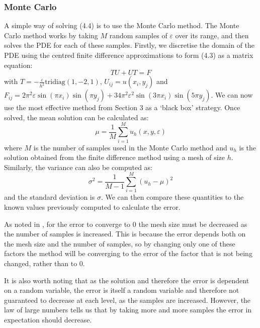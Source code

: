 \documentclass[11pt]{article}
\numberwithin{equation}{section}
\begin{document}
\subsubsection{Monte Carlo}
A simple way of solving (4.4) is to use the Monte Carlo method. The Monte Carlo method works by taking $M$ random samples of $\varepsilon$ over its range, and then solves the PDE for each of these samples. Firstly, we discretise the domain of the PDE using the centred finite difference approximations to form (4.3) as a matrix equation:
\begin{equation}
TU + UT = F
\end{equation}
with $T = -\frac{\varepsilon}{h^2} \text{tridiag}(1,-2,1)$, $U_{ij} = u(x_i, y_j)$ and $F_{ij} = 2\pi^2 \varepsilon \sin(\pi x_i) \sin(\pi y_j)+ 34 \pi^2 \varepsilon^2 \sin(3 \pi x_i) \sin(5 \pi y_j)$. We can now use the most effective method from Section 3 as a `black box' strategy. Once solved, the mean solution can be calculated as:
\begin{equation}
\mu = \frac{1}{M} \sum_{i=1}^M u_h (x, y, \varepsilon)
\end{equation}
where $M$ is the number of samples used in the Monte Carlo method and $u_h$ is the solution obtained from the finite difference method using a mesh of size $h$. Similarly, the variance can also be computed as:
\begin{equation}
\sigma^2 = \frac{1}{M-1}\sum_{i=1}^M (u_h - \mu)^2
\end{equation}
and the standard deviation is $\sigma$. We can then compare these quantities to the known values previously computed to calculate the error.

As noted in \cite{Bishop}, for the error to converge to 0 the mesh size must be decreased as the number of samples is increased. This is because the error depends both on the mesh size and the number of samples, so by changing only one of these factors the method will be converging to the error of the factor that is not being changed, rather than to 0. 

It is also worth noting that as the solution and therefore the error is dependent on a random variable, the error is itself a random variable and therefore not guaranteed to decrease at each level, as the samples are increased. However, the law of large numbers tells us that by taking more and more samples the error in expectation should decrease.
\end{document}
